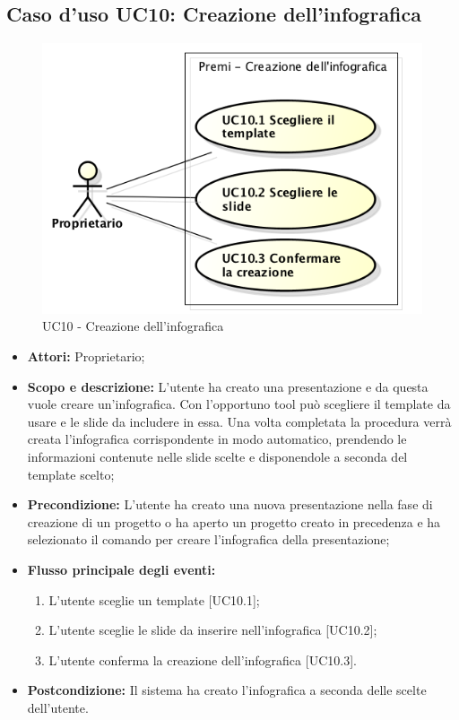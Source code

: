 \subsection{Caso d'uso UC10: Creazione dell'infografica}
\begin{figure}[h] 
	\centering 
	\includegraphics[scale=0.45] {img/UC10.png}
	\caption{UC10 - Creazione dell'infografica}
\end{figure}

\begin{itemize}
	\item \textbf{Attori:} Proprietario;
	\item \textbf{Scopo e descrizione:} L'utente ha creato una presentazione e da questa vuole creare un'\gls{infografica}. Con l'opportuno tool può scegliere il \gls{template} da usare e le \gls{slide} da includere in essa. Una volta completata la procedura verrà creata l'\gls{infografica} corrispondente in modo automatico, prendendo le informazioni contenute nelle \gls{slide} scelte e disponendole a seconda del \gls{template} scelto;
	\item \textbf{Precondizione:} L'utente ha creato una nuova presentazione nella fase di creazione di un progetto o ha aperto un progetto creato in precedenza e ha selezionato il comando per creare l'\gls{infografica} della presentazione;
	
	\item \textbf{Flusso principale degli eventi:}
	\begin{enumerate}
		\item L'utente sceglie un \gls{template} [UC10.1];
		\item L'utente sceglie le \gls{slide} da inserire nell'\gls{infografica} [UC10.2];
		\item L'utente conferma la creazione dell'\gls{infografica} [UC10.3].
	\end{enumerate}
	\item \textbf{Postcondizione:} Il sistema ha creato l'\gls{infografica} a seconda delle scelte dell'utente.
\end{itemize}


